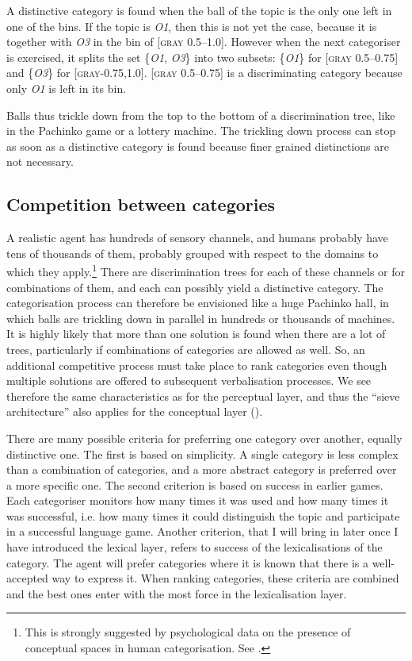 A distinctive category is found when the ball of the 
topic is the only one left in one of the bins. 
If the topic is \emph{O1}, then this is not yet the 
case, because it is together with \emph{O3} in the 
bin of [\textsc{gray} 0.5–1.0]. However when the next categoriser
is exercised, it splits the set \{\emph{O1}, \emph{O3}\} 
into two subsets: \{\emph{O1}\} for [\textsc{gray} 0.5–0.75]
and \{\emph{O3}\} for [\textsc{gray}-0.75,1.0]. 
[\textsc{gray} 0.5–0.75] is a discriminating category because only 
\emph{O1} is left in its bin. 

Balls thus trickle down from the top to the bottom of 
a discrimination tree, like in the Pachinko game or 
a lottery machine. The trickling down process can stop as
soon as a distinctive category is found because finer grained 
distinctions are not necessary. 

\subsection{Competition between categories}

A realistic agent has hundreds of sensory
channels, and humans probably have tens of thousands
of them, probably grouped with respect to the domains
to which they apply.\footnote{
This is strongly suggested by psychological 
data on the presence of conceptual spaces in human 
categorisation. See \cite{Gardenfors:1999}.} There are discrimination trees
for each of 
these channels or for combinations of them, and 
each can possibly yield a distinctive
category. The categorisation process can therefore be
envisioned like a huge Pachinko hall, in which
balls are trickling down in parallel in hundreds or 
thousands of machines. It is highly 
likely that more than one solution is found
when there are a lot of trees, particularly 
if combinations of categories are allowed as well. 
So, an additional competitive process must 
take place to rank categories even 
though multiple solutions are offered to subsequent
verbalisation processes. We see therefore the same
characteristics as for the perceptual layer, and thus
the ``sieve architecture'' also 
applies for the conceptual layer (). 
 
There are many possible criteria for preferring 
one category over another, equally distinctive one. 
The first is based on 
simplicity. A single category is less complex than 
a combination of categories, and a more abstract category 
is preferred over a more specific one. 
The second criterion is based on success in earlier games. 
Each categoriser monitors how many
times it was used and how many times
it was successful, i.e. how many times it could distinguish
the topic and participate in a successful language game. 
Another criterion, that I will bring in later 
once I have introduced the lexical layer, refers to 
success of the lexicalisations of the category. The agent 
will prefer categories where it is known that there is
a well-accepted way to express it. 
When ranking categories, these criteria are combined
and the best ones enter with the most force in the 
lexicalisation layer. 

